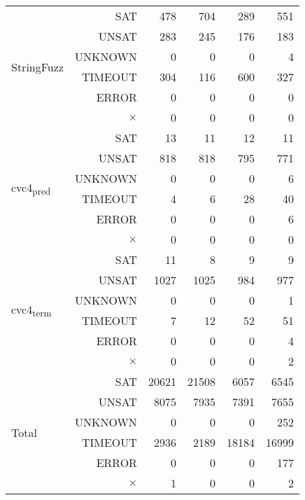 \documentclass[12pt]{article}
\begin{document}
\begin{table}[h]
{\begin{tabular}{|l r | r r r r |}
\multirow{6}{*}{StringFuzz}	& SAT      &   478&   704&   289&   551 \\
							& UNSAT    &   283&   245&   176&   183 \\
							& UNKNOWN  &     0&     0&     0&     4 \\
							& TIMEOUT  &   304&   116&   600&   327 \\
							& ERROR    &     0&     0&     0&     0 \\
							& $\times$ &     0&     0&     0&     0 \\\hline
\multirow{6}{*}{cvc4\textsubscript{pred}} & SAT &    13&    11&    12&    11 \\
							& UNSAT    &   818&   818&   795&   771 \\
							& UNKNOWN  &     0&     0&     0&     6 \\
							& TIMEOUT  &     4&     6&    28&    40 \\
							& ERROR    &     0&     0&     0&     6 \\
							& $\times$ &     0&     0&     0&     0 \\ \hline
\multirow{6}{*}{cvc4\textsubscript{term}} & SAT &    11&     8&     9&     9 \\
							& UNSAT    &  1027&  1025&   984&   977 \\
							& UNKNOWN  &     0&     0&     0&     1 \\
							& TIMEOUT  &     7&    12&    52&    51 \\
							& ERROR    &     0&     0&     0&     4 \\
							& $\times$ &     0&     0&     0&     2 \\ \hline \hline
\multirow{6}{*}{Total} 		& SAT      & 20621& 21508&  6057&  6545 \\
							& UNSAT    &  8075&  7935&  7391&  7655 \\
							& UNKNOWN  &     0&     0&     0&   252 \\
							& TIMEOUT  &  2936&  2189& 18184& 16999 \\
							& ERROR    &     0&     0&     0&   177 \\
							& $\times$ &     1&     0&     0&     2 \\\hline	
\end{tabular}}
\label{table:base_benchmark}
\end{table}
\end{document}
